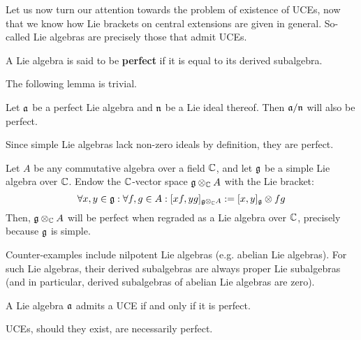         Let us now turn our attention towards the problem of existence of UCEs, now that we know how Lie brackets on central extensions are given in general. So-called  Lie algebras are precisely those that admit UCEs.
        \begin{definition}
            A Lie algebra is said to be \textbf{perfect} if it is equal to its derived subalgebra. 
        \end{definition}
        The following lemma is trivial.
        \begin{lemma} \label{lemma: quotients_of_perfect_lie_algebras}
            Let $\mathfrak{a}$ be a perfect Lie algebra and $\mathfrak{n}$ be a Lie ideal thereof. Then $\mathfrak{a}/\mathfrak{n}$ will also be perfect. 
        \end{lemma}
        \begin{example}
            Since simple Lie algebras lack non-zero ideals by definition, they are perfect. 
        \end{example}
        \begin{example}
            Let $A$ be any commutative algebra over a field $\mathbb{C}$, and let $\mathfrak{g}$ be a simple Lie algebra over $\mathbb{C}$. Endow the $\mathbb{C}$-vector space $\g \tensor_{\bbC} A$ with the Lie bracket:
                $$\forall x, y \in \g: \forall f, g \in A: [x f, y g]_{\g \tensor_{\bbC} A} := [x, y]_{\g} \tensor fg$$
            Then, $\g \tensor_{\bbC} A$ will be perfect when regraded as a Lie algebra over $\mathbb{C}$, precisely because $\mathfrak{g}$ is simple.
        \end{example}
        \begin{example}
            Counter-examples include nilpotent Lie algebras (e.g. abelian Lie algebras). For such Lie algebras, their derived subalgebras are always proper Lie subalgebras (and in particular, derived subalgebras of abelian Lie algebras are zero). 
        \end{example}
        \begin{proposition} \label{prop: perfect_lie_algebras_admit_UCEs}
            \cite[Lemma 1.10]{garland_arithmetics_of_loop_groups} A Lie algebra $\mathfrak{a}$ admits a UCE if and only if it is perfect.
        \end{proposition}
        \begin{corollary} \label{coro: UCEs_are_perfect}
            UCEs, should they exist, are necessarily perfect.
        \end{corollary}
